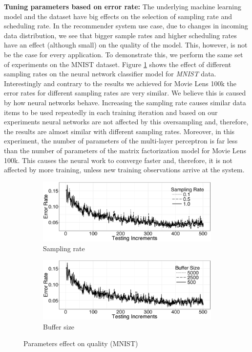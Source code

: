\documentclass{vldb}
\begin{document}
\textbf{Tuning parameters based on error rate:} The underlying machine learning model and the dataset have big effects on the selection of sampling rate and scheduling rate.
In the recommender system use case, due to changes in incoming data distribution, we see that bigger sample rates and higher scheduling rates have an effect (although small) on the quality of the model.
This, however, is not be the case for every application.
To demonstrate this, we perform the same set of experiments on the MNIST dataset.
Figure \ref{fig:mnist-sample-rate} shows the effect of different sampling rates on the neural network classifier model for \textit{MNIST} data.
Interestingly and contrary to the results we achieved for Movie Lens 100k the error rates for different sampling rates are very similar.
We believe this is caused by how neural networks behave.
Increasing the sampling rate causes similar data items to be used repeatedly in each training iteration and based on our experiments neural networks are not affected by this oversampling and, therefore, the results are almost similar with different sampling rates.
Moreover, in this experiment, the number of parameters of the multi-layer perceptron is far less than the number of parameters of the matrix factorization model for Movie Lens 100k.
This causes the neural work to converge faster and, therefore, it is not affected by more training, unless new training observations arrive at the system.
\begin{figure}[h]
\begin{subfigure}{\columnwidth}
\centering
\includegraphics[width=\columnwidth]{../images/experiment-results/mnist-sampling-improved.eps}
\caption{Sampling rate}
\label{fig:mnist-sample-rate}
\end{subfigure}
\begin{subfigure}{\columnwidth}
\centering
\includegraphics[width=\columnwidth]{../images/experiment-results/mnist-buffersize-improved.eps}
\caption{Buffer size}
\label{fig:mnist-buffer-size}
\end{subfigure}
\vspace{2mm}
\caption{Parameters effect on quality (MNIST)}
\end{figure}
\end{document}
